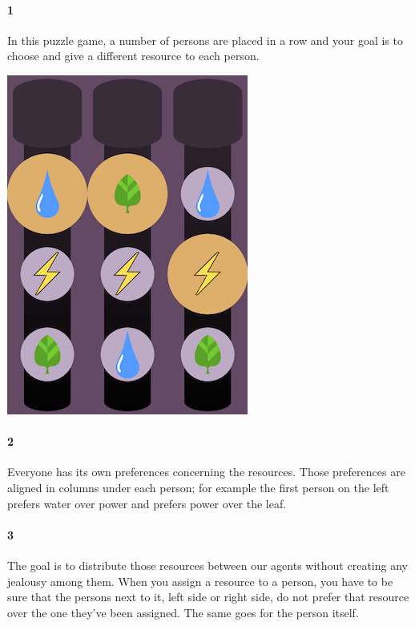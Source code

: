 \documentclass[a4paper, 11pt, titlepage]{article}
\newenvironment{figurecol}
  {\par\medskip\noindent\minipage{\linewidth}}
  {\endminipage\par\medskip}
\begin{document}
\begin{appendix}
\begin{multicols}{2}
        \paragraph{1}{In this puzzle game, a number of persons are placed in a row and your goal is to choose and give a different resource to each person.
        \begin{figurecol}
        \centering
        \includegraphics[width=0.8\linewidth]{tutorial1}
        \end{figurecol}
        }
        \paragraph{2}{Everyone has its own preferences concerning the resources. Those preferences are aligned in columns under each person; for example the first person on the left prefers water over power and prefers power over the leaf.}
        \paragraph{3}{The goal is to distribute those resources between our agents without creating any jealousy among them. When you assign a resource to a person, you have to be sure that the persons next to it, left side or right side, do not prefer that resource over the one they've been assigned. The same goes for the person itself.
        
}
\end{multicols}
\end{appendix}
\end{document}
